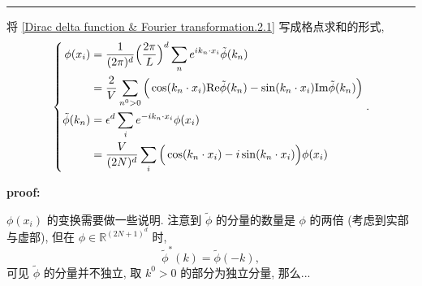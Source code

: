 \begin{itemize}
\begin{tcolorbox}[title=proof:]
		\noindent\rule[0.5ex]{\linewidth}{0.5pt} %
		
		将 \eqref{Dirac delta function & Fourier transformation.2.1} 写成格点求和的形式,
		\begin{equation} \label{Dirac delta function & Fourier transformation.2.5}
			\begin{dcases}
				\begin{aligned}
					\phi(x_i) &= \frac{1}{(2 \pi)^d} \Big( \frac{2 \pi}{L} \Big)^d \sum_n e^{i k_n \cdot x_i} \tilde{\phi}(k_n) \\
					&= \frac{2}{V} \sum_{n^0 > 0} \Big( \cos(k_n \cdot x_i) \mathrm{Re} \tilde{\phi}(k_n) - \sin(k_n \cdot x_i) \mathrm{Im} \tilde{\phi}(k_n) \Big) \\
					\tilde{\phi}(k_n) &= \epsilon^d \sum_i e^{- i k_n \cdot x_i} \phi(x_i) \\
					&= \frac{V}{(2 N)^d} \sum_i \Big( \cos(k_n \cdot x_i) - i \sin(k_n \cdot x_i) \Big) \phi(x_i)
				\end{aligned}
			\end{dcases}.
		\end{equation}
		
		\noindent\hdashrule[0.5ex]{\linewidth}{0.5pt}{1mm} %
		
		\textbf{proof:}
		
		$\phi(x_i)$ 的变换需要做一些说明. 注意到 $\tilde{\phi}$ 的分量的数量是 $\phi$ 的两倍 (考虑到实部与虚部), 但在 $\phi \in \mathbb{R}^{(2 N + 1)^d}$ 时,
		\begin{equation}
			\tilde{\phi}^*(k) = \tilde{\phi}(- k),
		\end{equation}
		可见 $\tilde{\phi}$ 的分量并不独立, 取 $k^0 > 0$ 的部分为独立分量, 那么...
		
		\noindent\hdashrule[0.5ex]{\linewidth}{0.5pt}{1mm} %
		

\end{tcolorbox}
\end{itemize}
